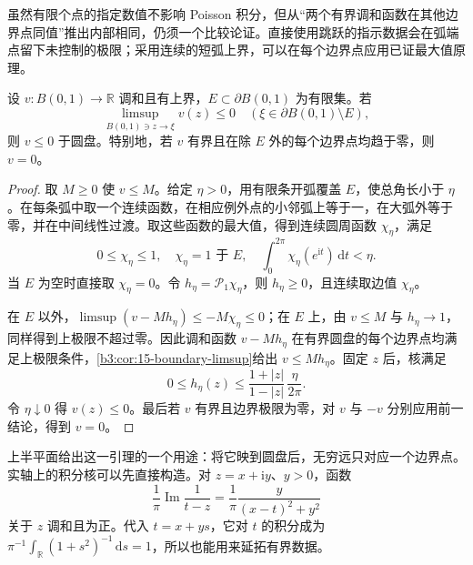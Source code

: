 \ProseParagraphBreak
虽然有限个点的指定数值不影响 Poisson 积分，但从“两个有界调和函数在其他边界点同值”推出内部相同，仍须一个比较论证。直接使用跳跃的指示数据会在弧端点留下未控制的极限；采用连续的短弧上界，可以在每个边界点应用已证最大值原理。

\begin{lemma}[有限边界例外集的比较]\label{b3:lem:16-finite-boundary-exceptions}
设 \(v:B(0,1)\to\mathbb R\) 调和且有上界，\(E\subset\partial B(0,1)\) 为有限集。若
\[
 \limsup_{B(0,1)\ni z\to\xi}v(z)\le0
 \quad(\xi\in\partial B(0,1)\setminus E),
\]
则 \(v\le0\) 于圆盘。特别地，若 \(v\) 有界且在除 \(E\) 外的每个边界点均趋于零，则 \(v=0\)。
\end{lemma}
\begin{proof}
取 \(M\ge0\) 使 \(v\le M\)。给定 \(\eta>0\)，用有限条开弧覆盖 \(E\)，使总角长小于 \(\eta\)。在每条弧中取一个连续函数，在相应例外点的小邻弧上等于一，在大弧外等于零，并在中间线性过渡。取这些函数的最大值，得到连续圆周函数 \(\chi_\eta\)，满足
\[
 0\le\chi_\eta\le1,\quad
 \chi_\eta=1\text{ 于 }E,\quad
 \int_0^{2\pi}\chi_\eta(e^{\mathrm i t})\,\mathrm dt<\eta.
\]
当 \(E\) 为空时直接取 \(\chi_\eta=0\)。令
\(h_\eta=\mathcal P_1\chi_\eta\)，则 \(h_\eta\ge0\)，且连续取边值 \(\chi_\eta\)。

在 \(E\) 以外，\(\limsup(v-Mh_\eta)\le-M\chi_\eta\le0\)；在 \(E\) 上，由 \(v\le M\) 与 \(h_\eta\to1\)，同样得到上极限不超过零。因此调和函数 \(v-Mh_\eta\) 在有界圆盘的每个边界点均满足上极限条件，\cref{b3:cor:15-boundary-limsup}给出
\(v\le Mh_\eta\)。固定 \(z\) 后，核满足
\[
 0\le h_\eta(z)
 \le\frac{1+|z|}{1-|z|}\,\frac{\eta}{2\pi}.
\]
令 \(\eta\downarrow0\) 得 \(v(z)\le0\)。最后若 \(v\) 有界且边界极限为零，对 \(v\) 与 \(-v\) 分别应用前一结论，得到 \(v=0\)。
\end{proof}

上半平面给出这一引理的一个用途：将它映到圆盘后，无穷远只对应一个边界点。实轴上的积分核可以先直接构造。对 \(z=x+\mathrm i y\)、\(y>0\)，函数
\[
 \frac1\pi\operatorname{Im}\frac1{t-z}
 =\frac1\pi\frac{y}{(x-t)^2+y^2}
\]
关于 \(z\) 调和且为正。代入 \(t=x+ys\)，它对 \(t\) 的积分成为
\(\pi^{-1}\int_{\mathbb R}(1+s^2)^{-1}\,\mathrm ds=1\)，所以也能用来延拓有界数据。

